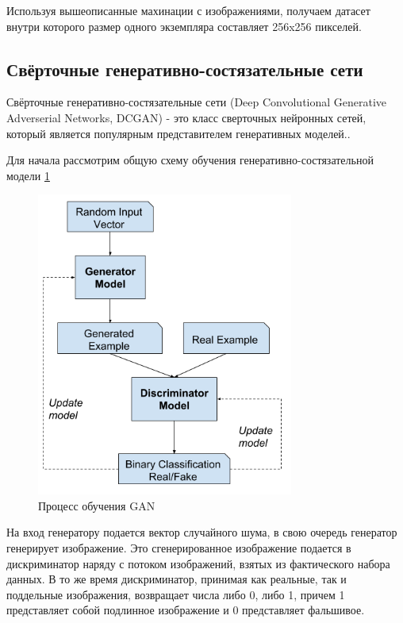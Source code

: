 Используя вышеописанные махинации с изображениями, получаем датасет внутри которого размер одного экземпляра составляет 256x256 пикселей.

\subsection{Свёрточные генеративно-состязательные сети}

\begin{definition}
    Свёрточные генеративно-состязательные сети (Deep Convolutional Generative Adverserial Networks, DCGAN) - это класс сверточных нейронных сетей, который является популярным представителем генеративных моделей.\cite{dcgan}.
\end{definition}

Для начала рассмотрим общую схему обучения генеративно-состязательной модели {\color{blue} \ref{fig.GAN_fit_scheme}}
\begin{figure}
    \centering
    \includegraphics[height=100mm]{fig/GAN_fit_scheme.png}
    \caption{Процесс обучения GAN}
    \label{fig.GAN_fit_scheme}
\end{figure}

На вход генератору подается вектор случайного шума, в свою очередь генератор генерирует изображение. Это сгенерированное изображение подается в дискриминатор наряду с потоком изображений, взятых из фактического набора данных. В то же время дискриминатор, принимая как реальные, так и поддельные изображения, возвращает числа либо 0, либо 1, причем 1 представляет собой подлинное изображение и 0 представляет фальшивое.

